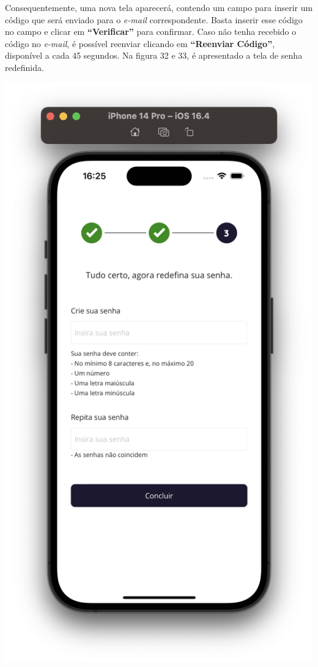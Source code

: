 Consequentemente, uma nova tela aparecerá, contendo um campo para inserir um código que será enviado para o \textit{e-mail} correspondente. Basta inserir esse código no campo e clicar em \textbf{“Verificar”} para confirmar. Caso não tenha recebido o código no \textit{e-mail}, é possível reenviar clicando em \textbf{“Reenviar Código”}, disponível a cada 45 segundos. Na figura 32 e 33, é apresentado a tela de senha redefinida.

    \begin{center}
        \begin{minipage}{0.4\textwidth}
            \centering
            \includegraphics[scale=0.2]{figs/figura32.png}

\end{minipage}
\end{center}
